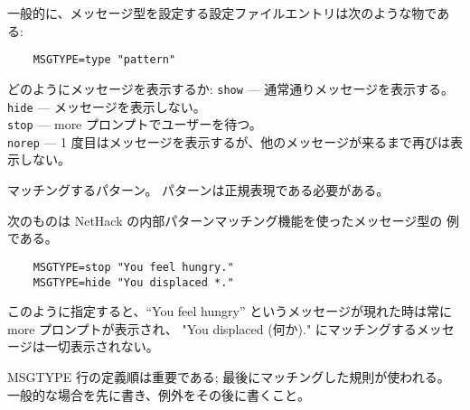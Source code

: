 一般的に、メッセージ型を設定する設定ファイルエントリは次のような物である:
\begin{verbatim}
    MSGTYPE=type "pattern"
\end{verbatim}
\blist{}
\item[\ib{type}]
どのようにメッセージを表示するか:
{\tt show}  --- 通常通りメッセージを表示する。\\
{\tt hide}  --- メッセージを表示しない。\\
{\tt stop}  --- more プロンプトでユーザーを待つ。\\
{\tt norep} --- 1 度目はメッセージを表示するが、他のメッセージが来るまで再びは表示しない。
\item[\ib{pattern}]
マッチングするパターン。
パターンは正規表現である必要がある。
\elist

次のものは NetHack の内部パターンマッチング機能を使ったメッセージ型の
例である。

\begin{verbatim}
    MSGTYPE=stop "You feel hungry."
    MSGTYPE=hide "You displaced *."
\end{verbatim}

このように指定すると、``You feel hungry'' というメッセージが現れた時は常に
more プロンプトが表示され、
"You displaced (何か)." にマッチングするメッセージは一切表示されない。

MSGTYPE 行の定義順は重要である; 最後にマッチングした規則が使われる。
一般的な場合を先に書き、例外をその後に書くこと。

